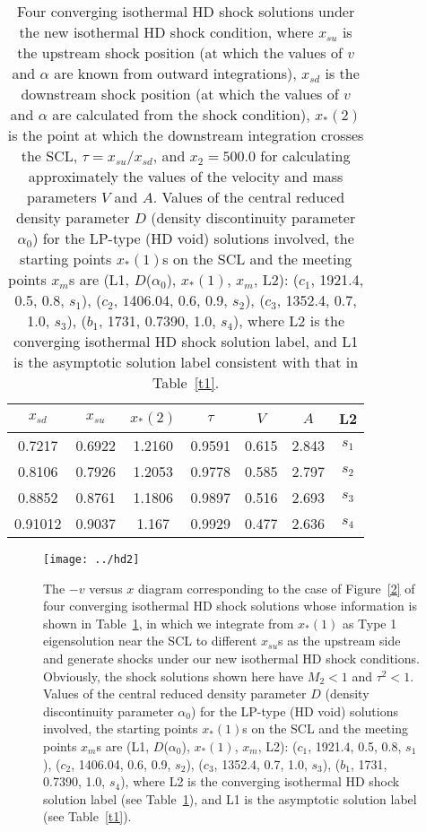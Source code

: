 \documentclass[fleqn,usenatbib]{mnras}
\begin{document}
\begin{table}
  \centering
  \caption{Four converging isothermal HD shock solutions under the new isothermal HD shock condition, where $x_{su}$ is the upstream shock position (at which the values of $v$ and $\alpha$ are known from outward integrations), $x_{sd}$ is the downstream shock position (at which the values of $v$ and $\alpha$ are calculated from the shock condition), $x_{*}(2)$ is the point at which the downstream integration crosses the SCL, $\tau=x_{su}/x_{sd}$, and $x_{2}=500.0$ for calculating approximately the values of the velocity and mass parameters $V$ and $A$. Values of the central reduced density parameter $D$ (density discontinuity parameter $\alpha_{0}$) for the LP-type (HD void) solutions involved, the starting points $x_{*}(1)$s on the SCL and the meeting points $x_{m}$s are (L1, $D$($\alpha_{0}$), $x_{*}(1)$, $x_{m}$, L2): ($c_{1}$, 1921.4, 0.5, 0.8, $s_{1}$), ($c_{2}$, 1406.04, 0.6, 0.9, $s_{2}$), ($c_{3}$, 1352.4, 0.7, 1.0, $s_{3}$), ($b_{1}$, 1731, 0.7390, 1.0, $s_{4}$), where L2 is the converging isothermal HD shock solution label, and L1 is the asymptotic solution label consistent with that in Table~\ref{t1}.}
    \begin{tabular}{ccccccc}
    \hline
    $x_{sd}$ & $x_{su}$ & $x_{*}(2)$ & $\tau$ & $V$ & $A$ & L2\\
    \hline
    0.7217 & 0.6922 & 1.2160 & 0.9591 & 0.615 & 2.843 & $s_{1}$ \\
    0.8106 & 0.7926 & 1.2053 & 0.9778 & 0.585 & 2.797 & $s_{2}$\\
    0.8852 & 0.8761 & 1.1806 & 0.9897 & 0.516 & 2.693 & $s_{3}$\\
    0.91012 & 0.9037 & 1.167 & 0.9929 & 0.477 & 2.636 & $s_{4}$\\
    \hline
    \end{tabular}
    \label{t2}
\end{table}    

\begin{figure}
\centering
\texttt{[image: ../hd2]}
\caption{The $-v$ versus $x$ diagram corresponding to the case of Figure~\ref{2} of four converging isothermal HD shock solutions whose information is shown in Table~\ref{t2}, in which we integrate from $x_{*}(1)$ as Type 1 eigensolution near the SCL to different $x_{su}$s as the upstream side and generate shocks under our new isothermal HD shock conditions. Obviously, the shock solutions shown here have $M_{2}<1$ and $\tau^{2}<1$. Values of the central reduced density parameter $D$ (density discontinuity parameter $\alpha_{0}$) for the LP-type (HD void) solutions involved, the starting points $x_{*}(1)$s on the SCL and the meeting points $x_{m}$s are (L1, $D$($\alpha_{0}$), $x_{*}(1)$, $x_{m}$, L2): ($c_{1}$, 1921.4, 0.5, 0.8, $s_{1}$), ($c_{2}$, 1406.04, 0.6, 0.9, $s_{2}$), ($c_{3}$, 1352.4, 0.7, 1.0, $s_{3}$), ($b_{1}$, 1731, 0.7390, 1.0, $s_{4}$), where L2 is the converging isothermal HD shock solution label (see Table~\ref{t2}), and L1 is the asymptotic solution label (see Table~\ref{t1}).}
\label{n1}
\end{figure}
\end{document}
